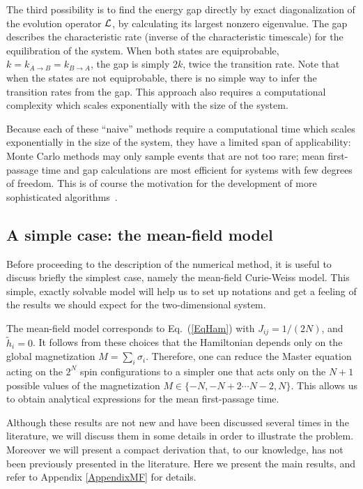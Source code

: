 \documentclass[aps,twocolumn,floats,pre,amsmath,superscriptaddress]{revtex4}
\let\s=\sigma \let\t=\tau \let\f=\varphi \let\ph=\varphi\let\c=\chi
\def\to{\rightarrow} \def\la{\langle} \def\ra{\rangle}
\newcommand{\<}{\langle}
\renewcommand{\>}{\rangle}
\begin{document}
The third possibility is to find the energy gap directly by exact diagonalization of the evolution operator ${\cal L}$, by calculating its largest nonzero eigenvalue. 
The gap describes the characteristic rate (inverse of the characteristic timescale) for the equilibration of the system. 
When both states are equiprobable, $k=k_{A\to B}=k_{B\to A}$, the gap is simply $2k$, twice the transition rate. 
Note that when the states are not equiprobable, there is no simple way to infer the transition rates from the gap.
This approach also requires a computational complexity which scales exponentially with the size of the system.

Because each of these ``naive'' methods require a computational time which scales exponentially in the size of the system,
they have a limited span of applicability: Monte Carlo
methods may only sample events that are not too rare; mean first-passage time
and gap calculations
are most efficient for systems with few degrees of freedom.
This is of course the motivation for the development of more sophisticated 
algorithms~\cite{valerianirev, chandler, dellago2, tenwoldeffs, weinane_erik, erik2, kurchan1, kurchan2, picciani}.



\subsection{A simple case: the mean-field model}
\label{sec:MF}

Before proceeding to the description of the numerical method,
it is useful to discuss briefly
the simplest case, namely the mean-field Curie-Weiss
model. This simple, exactly solvable model will help us to set up
notations and get a feeling of the results we should expect for the
two-dimensional system.

The mean-field model corresponds to Eq.~(\ref{EqHam}) with $J_{ij} = 1/(2N)$, and $\tilde h_i = 0$.
It follows from these choices that the Hamiltonian depends only on the global
magnetization $M = \sum_i \s_i$. Therefore, one can reduce the Master equation
acting on the $2^N$ spin configurations to a simpler one that acts only on the $N+1$
possible values of the magnetization $M \in \{ -N, -N+2 \cdots N-2, N
\}$. This allows us
to obtain analytical expressions for the mean first-passage time.

Although these results are not new and have been discussed several times in the literature,
we will discuss them in some details in order to illustrate the problem. Moreover we will
present a  compact derivation that, to our knowledge, has not been previously 
presented in the literature. Here we present the main results, and refer to Appendix \ref{AppendixMF} for details.
\end{document}
